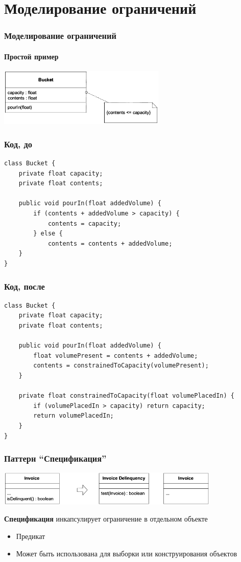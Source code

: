 \documentclass[xetex,mathserif,serif]{beamer}
\begin{document}
	\section{Моделирование ограничений}

	\begin{frame}
		\frametitle{Моделирование ограничений}
		\framesubtitle{Простой пример}
		\begin{center}
			\includegraphics[width=0.6\textwidth]{bucket.png}
		\end{center}
	\end{frame}

	\begin{frame}[fragile]
		\frametitle{Код, до}
		\begin{verbatim}
class Bucket {
    private float capacity;
    private float contents;

    public void pourIn(float addedVolume) {
        if (contents + addedVolume > capacity) {
            contents = capacity;
        } else {
            contents = contents + addedVolume;
    }
}
		\end{verbatim}
	\end{frame}

	\begin{frame}[fragile]
		\frametitle{Код, после}
		\begin{verbatim}
class Bucket {
    private float capacity;
    private float contents;

    public void pourIn(float addedVolume) {
        float volumePresent = contents + addedVolume;
        contents = constrainedToCapacity(volumePresent);
    }

    private float constrainedToCapacity(float volumePlacedIn) {
        if (volumePlacedIn > capacity) return capacity;
        return volumePlacedIn;
    }
} 
		\end{verbatim}
	\end{frame}

	\begin{frame}
		\frametitle{Паттерн ``Спецификация''}
		\begin{center}
			\includegraphics[width=0.8\textwidth]{specification.png}
		\end{center}
		\textbf{Спецификация} инкапсулирует ограничение в отдельном объекте
		\begin{itemize}
			\item Предикат
			\item Может быть использована для выборки или конструирования объектов
		\end{itemize}
	\end{frame}
\end{document}
